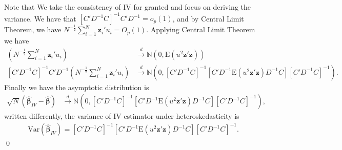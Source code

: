 \documentclass[10pt]{article}
\newcommand{\N}{\mathbb{N}}
\newcommand{\E}{\text{E}}
\newcommand{\V}{\text{Var}}
\begin{document}
Note that We take the consistency of IV for granted and focus on deriving the variance. We have that $[C'D^{-1}C]^{-1}C'D^{-1}=o_p(1)$, and by Central Limit Theorem, we have $N^{-\frac{1}{2}}\sum_{i=1}^N\textbf{z}_i'u_i=O_p(1).$ Applying Central Limit Theorem we have
\begin{align*}
    \left(N^{-\frac{1}{2}}\sum_{i=1}^N\textbf{z}_i'u_i\right)&\xrightarrow{d}\N(0,\E(u^2\textbf{z}'\textbf{z}))\\
    [C'D^{-1}C]^{-1}C'D^{-1}\left(N^{-\frac{1}{2}}\sum_{i=1}^N\textbf{z}_i'u_i\right)&\xrightarrow{d}\N(0,[C'D^{-1}C]^{-1}[C'D^{-1}\E(u^2\textbf{z}'\textbf{z})D^{-1}C][C'D^{-1}C]^{-1}).
\end{align*}
Finally we have the asymptotic distribution is
\begin{align*}
    \sqrt{N}(\hat{\pmb{\beta}}_{IV}-\hat{\pmb{\beta}})&\xrightarrow{d}\N(0,[C'D^{-1}C]^{-1}[C'D^{-1}\E(u^2\textbf{z}'\textbf{z})D^{-1}C][C'D^{-1}C]^{-1}),
\end{align*}
written differently, the variance of IV estimator under heteroskedasticity is
\begin{align*}
    \V(\hat{\pmb{\beta}}_{IV})=[C'D^{-1}C]^{-1}[C'D^{-1}\E(u^2\textbf{z}'\textbf{z})D^{-1}C][C'D^{-1}C]^{-1}.
\end{align*}\qed
\end{document}
